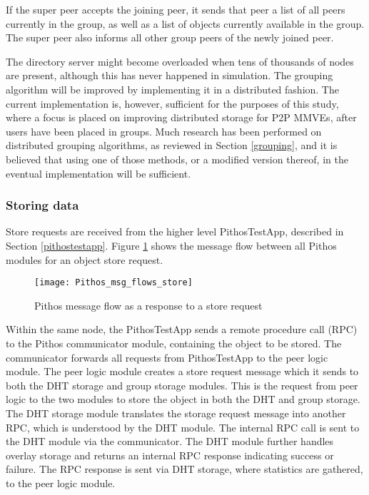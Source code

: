     If the super peer accepts the joining peer, it sends that peer a list of all peers currently in the group, as well as a list of objects currently available in the group. The super peer also informs all other group peers of the newly joined peer.

    The directory server might become overloaded when tens of thousands of nodes are present, although this has never happened in simulation. The grouping algorithm will be improved by implementing it in a distributed fashion. The current implementation is, however, sufficient for the purposes of this study, where a focus is placed on improving distributed storage for P2P MMVEs, after users have been placed in groups. Much research has been performed on distributed grouping algorithms, as reviewed in Section \ref{grouping}, and it is believed that using one of those methods, or a modified version thereof, in the eventual implementation will be sufficient.

    \subsubsection{Storing data}
    \label{store_implementation}

    Store requests are received from the higher level PithosTestApp, described in Section \ref{pithostestapp}. Figure \ref{fig_pithos_msg_flow_store} shows the message flow between all Pithos modules for an object store request.

\begin{figure}[htbp]
 \centering
 \texttt{[image: Pithos\_msg\_flows\_store]}
 \caption{Pithos message flow as a response to a store request}
 \label{fig_pithos_msg_flow_store}
\end{figure}

Within the same node, the PithosTestApp sends a remote procedure call (RPC) to the Pithos communicator module, containing the object to be stored. The communicator forwards all requests from PithosTestApp to the peer logic module. The peer logic module creates a store request message which it sends to both the DHT storage and group storage modules. This is the request from peer logic to the two modules to store the object in both the DHT and group storage. The DHT storage module translates the storage request message into another RPC, which is understood by the DHT module. The internal RPC call is sent to the DHT module via the communicator. The DHT module further handles overlay storage and returns an internal RPC response indicating success or failure. The RPC response is sent via DHT storage, where statistics are gathered, to the peer logic module.

